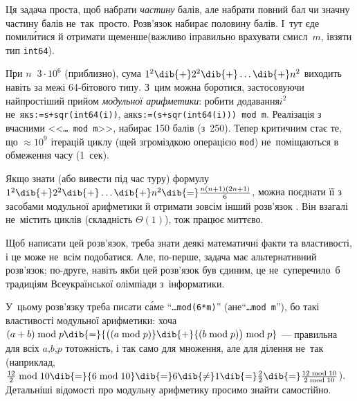 \Tutorial
Ця задача проста, щоб набрати \emph{частину} балів, але набрати повний бал чи значну частину балів не~так~просто. Розв'язок  набирає половину балів. 
І~тут є\nolinebreak[2] де помил\'{и}тися й отримати ще\nolinebreak[3] менше\nolinebreak[3] (важливо і\nolinebreak[3] правильно врахувати смисл~$m$, і\nolinebreak[3] взяти тип \texttt{int64}).

При ${n\,{\>}\,3{\cdot}10^6}$ (приблизно), сума $1^2\dib{{+}}2^2\dib{{+}}\dots\dib{{+}}n^2$ виходить навіть за межі 64-\nolinebreak[2]бітового типу. З~цим можна боротися, застосовуючи найпростіший прийом \emph{модульної арифметики}: робити додавання\nolinebreak[3] $i^2$ не~як\nolinebreak[3] \verb"s:=s+sqr(int64(i))", а\nolinebreak[2] як\nolinebreak[3] \verb"s:=(s+sqr(int64(i))) mod m". 
Реалізація з вчасними <<\texttt{\dots~mod~m}>>, набирає 150 балів (з~250). 
Тепер критичним стає те, що $\approx{}10^9$ ітерацій циклу (ще\nolinebreak[3] й з\nolinebreak[2] громіздкою операцією \texttt{mod}) не~поміщаються в обмеження часу (1~сек).

Якщо знати (або вивести під час туру) формулу $1^2\dib{{+}}2^2\dib{{+}}\dots\dib{{+}}n^2\dib{{=}}\frac{n(n+1)(2n+1)}{6}$, можна поєднати її з засобами модульної арифметики й отримати зовсім інший розв'язок . Він взагалі не~містить циклів (складність $\Theta(1)$), тож працює миттєво.

Щоб написати цей розв'язок, треба знати деякі математичні факти та властивості, і це може не~всім подобатися. Але, по-перше, задача має альтернативний розв'язок; по-друге, навіть якби цей розв'язок був єдиним, це не~суперечило~б традиціям Всеукраїнської олімпіади з~інформатики.

У~цьому розв'язку треба писати с\'{а}ме ``\texttt{\dots\nolinebreak[3] mod\nolinebreak[3] \mbox{(6*m)}}'' (а\nolinebreak[2] не\nolinebreak[3] ``\texttt{\dots\nolinebreak[3] mod~m}''), бо такі властивості модульної арифметики: хоча ${(a+b)\bmod p} \dib{{=}} {\bigl((a\bmod p)}\dib{{+}}{(b\bmod p)\bigr)\bmod p}$\label{text:trivial-proof-for-add-in-ring} --- правильна для всіх $a$,\nolinebreak[2] $b$,\nolinebreak[2] $p$ тотожність, і так само для множення, але для ділення не~так (наприклад, 
${\tfrac{12}{2}\bmod10}\dib{{=}}{6\bmod10}\dib{{=}}6\dib{{\neq}}1\dib{{=}}\tfrac{2}{2}\dib{{=}}\tfrac{12\bmod10}{2\bmod10}$). 
Детальніші відомості про модульну арифметику просимо знайти %
самостійно.

